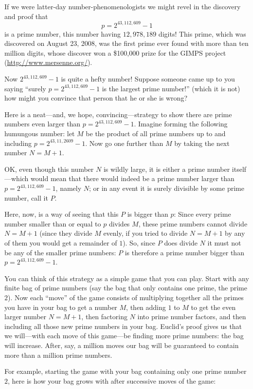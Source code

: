 \documentclass[11pt]{article}
\theoremstyle{plain}
\theoremstyle{definition}
\numberwithin{equation}{section}
\numberwithin{figure}{section}
\numberwithin{table}{section}
\begin{document}
If we were latter-day number-phenomenologists we might revel in the
discovery and proof that
$$
  p=2^{43,112,609}-1
$$ 
is a prime number, this number having $12,\!978,\!189$ digits!  This
prime, which was discovered on August 23, 2008, was the first prime
ever found with more than ten million digits, whose discover won a
\$100,000 prize for the GIMPS project (\url{http://www.mersenne.org/}).

Now $2^{43,112,609}-1$ is quite a hefty number! Suppose someone came
up to you saying ``surely $p = 2^{43,112,609}-1$ is the largest prime
number!'' (which it is not) how might you convince that person that
he or she is wrong?

Here is a neat---and, we hope, convincing---strategy to show there are
prime numbers even larger than $p = 2^{43,112,609} - 1$. Imagine
forming the following humungous number: let $M$ be the product of all
prime numbers up to and including $p = 2^{43,11,2609} - 1$.  Now go
one further than $M$ by taking the next number $N=M+1$.
 

OK, even though this number $N$ is wildly large, it is either a prime
number itself---which would mean that there would indeed be a prime
number larger than $p=2^{43,112,609} - 1$, namely $N$; or in any event it is
surely divisible by some prime number, call it $P$.

Here, now, is a way of seeing that this $P$ is bigger than $p$: Since
every prime number smaller than or equal to $p$ divides $M$, these
prime numbers cannot divide $N= M+1$ (since they divide $M$ evenly, if
you tried to divide $N=M+1$ by any of them you would get a remainder
of $1$).  So, since $P$ does divide $N$ it must not be any of the
smaller prime numbers: $P$ is therefore a prime number bigger than $p=
2^{43,112,609}-1$.

You can think of this strategy as a simple game that you can
play. Start with any finite bag of prime numbers (say the bag that
only contains one prime, the prime $2$). Now each ``move'' of the game
consists of multiplying together all the primes you have in your bag
to get a number $M$, then adding $1$ to $M$ to get the even larger
number $N=M+1$, then factoring $N$ into prime number factors, and then
including all those new prime numbers in your bag. Euclid's proof
gives us that we will---with each move of this game---be finding more
prime numbers: the bag will increase. After, say, a million moves our
bag will be guaranteed to contain more than a million prime numbers.

For example, starting the game with your bag containing
only one prime number $2$, here is how your bag grows with after
successive moves of the game:
\end{document}
